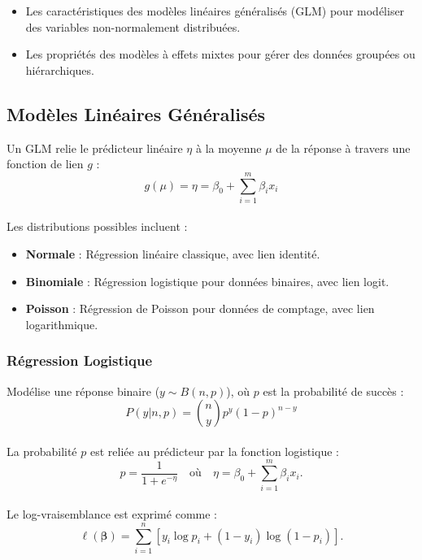 \documentclass[
]{article}
\begin{document}
\begin{itemize}
\item
  Les caractéristiques des modèles linéaires généralisés (GLM) pour
  modéliser des variables non-normalement distribuées.
\item
  Les propriétés des modèles à effets mixtes pour gérer des données
  groupées ou hiérarchiques.
\end{itemize}

\subsection{Modèles Linéaires
Généralisés}\label{moduxe8les-linuxe9aires-guxe9nuxe9ralisuxe9s}

Un GLM relie le prédicteur linéaire \(\eta\) à la moyenne \(\mu\) de la
réponse à travers une fonction de lien \(g\) :\\
\[ g(\mu) = \eta = \beta_0 + \sum_{i=1}^m \beta_i x_i \]\\
Les distributions possibles incluent :

\begin{itemize}
\item
  \textbf{Normale} : Régression linéaire classique, avec lien identité.
\item
  \textbf{Binomiale} : Régression logistique pour données binaires, avec
  lien logit.
\item
  \textbf{Poisson} : Régression de Poisson pour données de comptage,
  avec lien logarithmique.
\end{itemize}

\subsubsection{Régression Logistique}\label{ruxe9gression-logistique}

Modélise une réponse binaire (\(y \sim B(n, p)\)), où \(p\) est la
probabilité de succès :\\
\[ P(y | n, p) = \binom{n}{y} p^y (1-p)^{n-y} \]\\
La probabilité \(p\) est reliée au prédicteur par la fonction logistique
:\\
\[ p = \frac{1}{1 + e^{-\eta}} \quad \text{où} \quad \eta = \beta_0 + \sum_{i=1}^m \beta_i x_i. \]\\
Le log-vraisemblance est exprimé comme :\\
\[ \ell(\boldsymbol{\beta}) = \sum_{i=1}^n \left[ y_i \log{p_i} + (1-y_i) \log{(1-p_i)} \right]. \]
\end{document}
